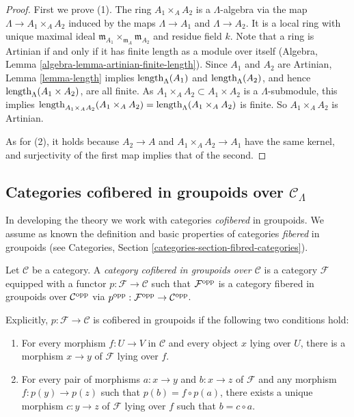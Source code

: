 \begin{proof}
First we prove (1).  The ring $A_1 \times_{A} A_2$ is a $\Lambda$-algebra via 
the map $\Lambda \rightarrow A_1 \times_{A} A_2$ induced by the maps $\Lambda 
\rightarrow A_1$ and $\Lambda \rightarrow A_2$.  It is a local ring with unique 
maximal ideal $\mathfrak{m}_{A_1} \times_{\mathfrak{m}_{A}} \mathfrak{m}_{A_2}$ 
and residue field $k$. Note that a ring is Artinian if and only if it has 
finite length as a module over itself
(Algebra, Lemma \ref{algebra-lemma-artinian-finite-length}).
Since $A_1$ and $A_2$ are Artinian, Lemma \ref{lemma-length} implies 
$\textnormal{length}_{\Lambda}(A_1)$ and $\textnormal{length}_{\Lambda}(A_2)$, 
and hence $\textnormal{length}_{\Lambda}(A_1 \times A_2)$, are all finite.  As 
$A_1 \times_A A_2 \subset A_1 \times A_2$ is a $\Lambda$-submodule, this 
implies $\textnormal{length}_{A_1 \times_A A_2}(A_1 \times_{A} A_2) = 
\textnormal{length}_{\Lambda}(A_1 \times_{A} A_2)$ is finite. So $A_1 
\times_{A} A_2$ is Artinian.

\medskip \noindent
As for (2), it holds because $A_2 \rightarrow A$ and $A_1 \times_{A} A_2 
\rightarrow A_1$ have the same kernel, and surjectivity of the first map 
implies that of the second.
\end{proof}


\subsection{Categories cofibered in groupoids over $\mathcal C_{\Lambda}$}
\label{subsection-cofibered-groupoids}
In developing the theory we work with categories \emph{cofibered} in groupoids. 
 We assume as known the definition and basic properties of categories 
\emph{fibered} in groupoids (see
Categories, Section \ref{categories-section-fibred-categories}).

\begin{definition}
Let $\mathcal C$ be a category.  A \emph{category cofibered in groupoids over 
$\mathcal C$} is a category $\mathcal F$ equipped with a functor $p: \mathcal F 
\rightarrow \mathcal C$ such that $\mathcal F^{\textnormal{opp}}$ is a category 
fibered in groupoids over $\mathcal C^{\textnormal{opp}}$ via 
$p^{\textnormal{opp}}: \mathcal F^{\textnormal{opp}} \rightarrow \mathcal 
C^{\textnormal{opp}}$.
\end{definition}

\noindent
Explicitly, $p: \mathcal F \rightarrow \mathcal C$ is cofibered in groupoids if 
the following two conditions hold:
\begin{enumerate}
\item For every morphism $f: U \rightarrow V$ in $\mathcal C$ and every object 
$x$ lying over $U$, there is a morphism $x \rightarrow y$ of $\mathcal F$ lying 
over $f$.

\item For every pair of morphisms $a: x \rightarrow y$ and $b: x \rightarrow z$ 
of $\mathcal F$ and any morphism $f: p(y) \rightarrow p(z)$ such that $p(b) = f 
\circ p(a)$, there exists a unique morphism $c: y \rightarrow z$ of $\mathcal 
F$ lying over $f$ such that $b = c \circ a$.
\end{enumerate}

